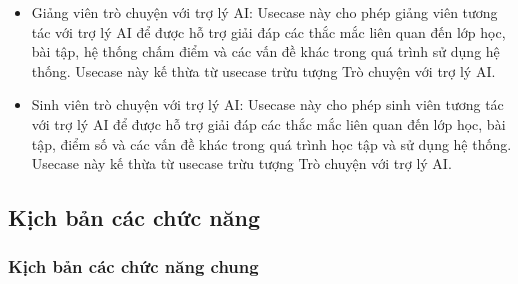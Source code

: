 \documentclass[../BTL.tex]{subfiles}
\begin{document}
\begin{itemize}
    \item Giảng viên trò chuyện với trợ lý AI: Usecase này cho phép giảng viên tương tác với trợ lý AI để được hỗ trợ giải đáp các thắc mắc liên quan đến lớp học, bài tập, hệ thống chấm điểm và các vấn đề khác trong quá trình sử dụng hệ thống. Usecase này kế thừa từ usecase trừu tượng Trò chuyện với trợ lý AI.
    \item Sinh viên trò chuyện với trợ lý AI: Usecase này cho phép sinh viên tương tác với trợ lý AI để được hỗ trợ giải đáp các thắc mắc liên quan đến lớp học, bài tập, điểm số và các vấn đề khác trong quá trình học tập và sử dụng hệ thống. Usecase này kế thừa từ usecase trừu tượng Trò chuyện với trợ lý AI.
\end{itemize}

\subsection{Kịch bản các chức năng}


\subsubsection{Kịch bản các chức năng chung}
\end{document}
